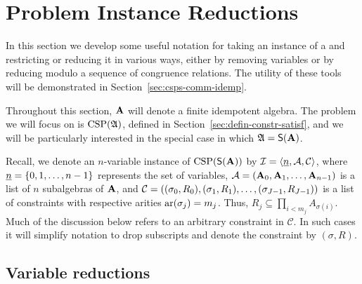 \section{Problem Instance Reductions}\label{sec:var-reduc}
In this section we develop some useful notation for taking an instance of 
a \csp and restricting or reducing it in various ways,
either by removing variables or by reducing modulo a sequence of congruence relations. 
The utility of these tools will be demonstrated in Section~\ref{sec:csps-comm-idemp}.

Throughout this section, $\mathbf{A}$ will denote a finite idempotent algebra.
The problem we will focus on is $\operatorname{CSP}(\mathfrak A)$, defined in
Section~\ref{sec:defin-constr-satisf}, and we will be particularly interested
in the special case in which $\mathfrak A = \mathsf{S}(\mathbf{A})$.

Recall, we denote an $n$-variable instance of $\operatorname{CSP}(\mathsf{S}(\mathbf{A}))$ by
$\mathcal{I} = \langle \underline{n}, \mathcal{A}, \mathcal C\rangle$, where $\underline{n} = \{0, 1, \dots, n-1\}$
represents the set of variables,
$\mathcal{A} = (\mathbf{A}_0, \mathbf{A}_1, \dots, \mathbf{A}_{n-1})$ %
is a list of $n$ subalgebras of $\mathbf{A}$, and
$\mathcal{C} = ((\sigma_0, R_0), (\sigma_1, R_1), \dots, (\sigma_{J-1}, R_{J-1}))$
is a list of constraints with respective arities $\operatorname{ar}(\sigma_j) = m_j$.
Thus, $R_j\subseteq \prod_{i < m_j} A_{\sigma(i)}$.
Much of the discussion below refers to an arbitrary constraint
in $\mathcal C$. In such cases it will simplify notation 
to drop subscripts and denote the constraint by $(\sigma, R)$.

\subsection{Variable reductions}
